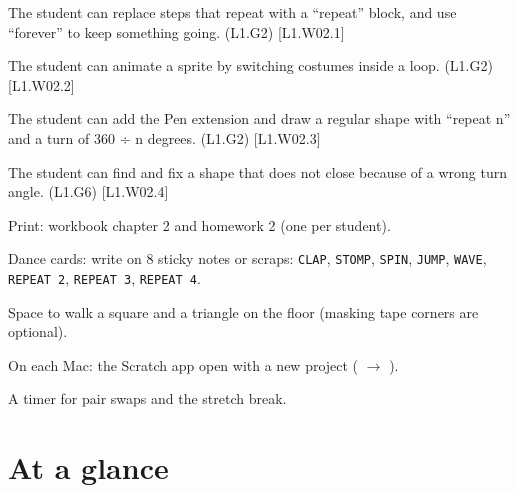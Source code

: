 
\begin{objectives}
  \item The student can replace steps that repeat with a \enquote{repeat} block, and use \enquote{forever} to keep something going. (L1.G2) [L1.W02.1]
  \item The student can animate a sprite by switching costumes inside a loop. (L1.G2) [L1.W02.2]
  \item The student can add the Pen extension and draw a regular shape with \enquote{repeat n} and a turn of 360 ÷ n degrees. (L1.G2) [L1.W02.3]
  \item The student can find and fix a shape that does not close because of a wrong turn angle. (L1.G6) [L1.W02.4]
\end{objectives}

\begin{materials}
  \item Print: workbook chapter 2 and homework 2 (one per student).
  \item Dance cards: write on 8 sticky notes or scraps: \texttt{CLAP}, \texttt{STOMP}, \texttt{SPIN}, \texttt{JUMP}, \texttt{WAVE}, \texttt{REPEAT 2}, \texttt{REPEAT 3}, \texttt{REPEAT 4}.
  \item Space to walk a square and a triangle on the floor (masking tape corners are optional).
  \item On each Mac: the Scratch app open with a new project ( $\rightarrow$ ).
  \item A timer for pair swaps and the stretch break.
\end{materials}

\section{At a glance}
\begin{timeplan}
\end{timeplan}

